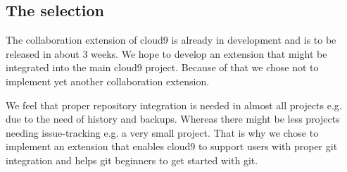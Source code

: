 \subsection{The selection}

The collaboration extension of cloud9 is already in development and is to be released in about 3 weeks.
We hope to develop an extension that might be integrated into the main cloud9 project.
Because of that we chose not to implement yet another collaboration extension.

We feel that proper repository integration is needed in almost all projects e.g. due to the need of history and backups.
Whereas there might be less projects needing issue-tracking e.g. a very small project.
That is why we chose to implement an extension that enables cloud9 to support users with proper git integration and helps git beginners to get started with git.

